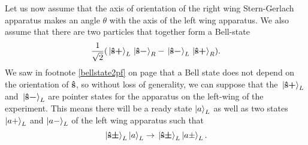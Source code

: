 Let us now assume that the axis of orientation of the right wing Stern-Gerlach apparatus makes an angle $\theta$ with the axis of the left wing apparatus. We also assume that there are two particles that together form a Bell-state \begin{equation}\label{bellstatePI}
	\frac{1}{\sqrt{2}}(\ket*{{\vb{\hat{{s}}}\bm{+}}}_L\ket*{{\vb{\hat{{s}}}\bm{-}}}_R-\ket*{{\vb{\hat{{s}}}\bm{-}}}_L\ket*{{\vb{\hat{{s}}}\bm{+}}}_R).
\end{equation}
We saw  in footnote \ref{bellstate2pf} on page \pageref{bellstate2pf} that a Bell state does not depend on the orientation of $\vb{\hat{{s}}}$, so without loss of generality, we can suppose that the $\ket*{{\vb{\hat{{s}}}\bm{+}}}_L$ and $\ket*{{\vb{\hat{{s}}}\bm{-}}}_L$ %
%
 are pointer states for the apparatus on the left-wing of the experiment. This means there will be a ready state $\ket{a}_L$  %
  as well as two states $\ket{a+}_L$ and $\ket{a-}_L$ %
   of the left wing apparatus such that 
$$\ket*{{\vb{\hat{{s}}}\bm{\pm}}}_L\ket{a}_L\rightarrow\ket*{{\vb{\hat{{s}}}\bm{\pm}}}_L\ket{a\pm}_L.$$

